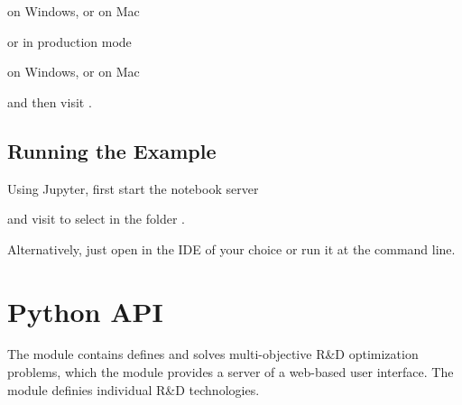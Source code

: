 \documentclass[letterpaper,10pt,english]{sphinxmanual}
\begin{document}
on Windows, or on Mac

\begin{sphinxVerbatim}[commandchars=\\\{\}]
 
\end{sphinxVerbatim}

or in production mode

\begin{sphinxVerbatim}[commandchars=\\\{\}]
 \PYGZbs{}
\end{sphinxVerbatim}

on Windows, or on Mac

\begin{sphinxVerbatim}[commandchars=\\\{\}]
 
\end{sphinxVerbatim}

and then visit .


\section{Running the Example}
\label{\detokenize{getting-started:running-the-example}}
Using Jupyter, first start the notebook server

\begin{sphinxVerbatim}[commandchars=\\\{\}]
 
\end{sphinxVerbatim}

and visit  to select  in the folder .

Alternatively, just open  in the IDE of your
choice or run it at the command line.


\chapter{Python API}
\label{\detokenize{modules:python-api}}\label{\detokenize{modules::doc}}
The module {\hyperref[\detokenize{tyche:module-tyche}]{}} contains defines and solves multi-objective R\&D
optimization problems, which the module {\hyperref[\detokenize{eutychia:module-eutychia}]{}} provides a server
of a web-based user interface. The module {\hyperref[\detokenize{technology:module-technology}]{}} definies
individual R\&D technologies.
\end{document}

